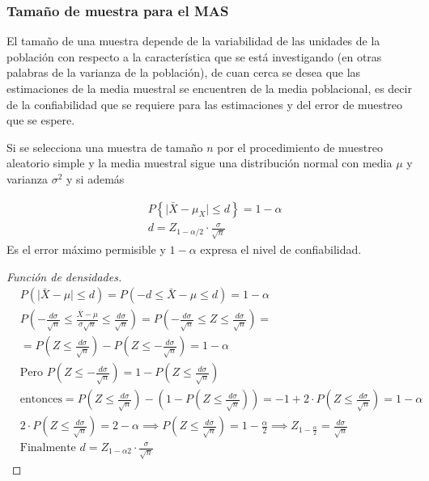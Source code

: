 \subsubsection{Tamaño de muestra para el MAS}

El tamaño de una muestra depende de la variabilidad de las unidades de 
la población con respecto a la característica que se está investigando 
(en otras palabras de la varianza de la población), de cuan cerca se 
desea que las estimaciones de la media muestral se encuentren de la 
media poblacional, es decir de la confiabilidad que se requiere para 
las estimaciones y del error de muestreo que se espere.

\begin{theorem}
    Si se selecciona una
    muestra de tamaño $n$ por el
    procedimiento de muestreo aleatorio
    simple y la media muestral sigue una
    distribución normal con media $\mu$  y
    varianza $\sigma^2$ y si además

    \begin{align}
         & P\left\{\mid \bar{X}-\mu_X\mid \leq d \right\}=1-\alpha \\
         & d=Z_{1-\alpha/2}\cdot \frac{\sigma}{\sqrt{n}}
    \end{align}
    Es el error máximo permisible y $1-\alpha$  expresa el nivel de confiabilidad.
\end{theorem}

\begin{proof}[Función de densidades]
    \begin{align*}
         & P(\mid \bar{X} -\mu \mid \leq d )=P (-d\leq \bar{X} -\mu \leq d )=1-\alpha                                                                                                                \\
         & P\left(-\frac{d\sigma}{\sqrt{n}}\leq \frac{\bar{X}-\mu}{\sigma  \sqrt{n}}\leq \frac{d\sigma}{\sqrt{n}}\right)=P\left(-\frac{d\sigma}{\sqrt{n}}\leq Z\leq \frac{d\sigma}{\sqrt{n}}\right)= \\
         & =P\left(Z\leq \frac{d\sigma}{\sqrt{n}}\right)-P\left(Z\leq -\frac{d\sigma}{\sqrt{n}}\right)=1-\alpha                                                                                      \\
         & \text{Pero }P\left(Z\leq -\frac{d\sigma}{\sqrt{n}}\right)=1-P\left(Z\leq \frac{d\sigma}{\sqrt{n}}\right)                                                                                  \\
         & \text{entonces}=P(Z\leq \frac{d\sigma}{\sqrt{n}} )-\left(1-P\left(Z\leq \frac{d\sigma}{\sqrt{n}}\right)\right)=-1+2\cdot  P\left(Z\leq \frac{d\sigma}{\sqrt{n}}\right)=1-\alpha           \\
         & 2\cdot  P(Z\leq \frac{d\sigma}{\sqrt{n}} )=2-\alpha  \implies  P(Z\leq \frac{d\sigma}{\sqrt{n}} )=1-\frac{\alpha}{2}\implies  Z_{1-\frac{\alpha}{2}}=\frac{d\sigma}{\sqrt{n}}             \\
         & \text{Finalmente } d=Z_{1-\alpha 2}\cdot\frac{\sigma}{\sqrt{n}}
    \end{align*}
\end{proof}

